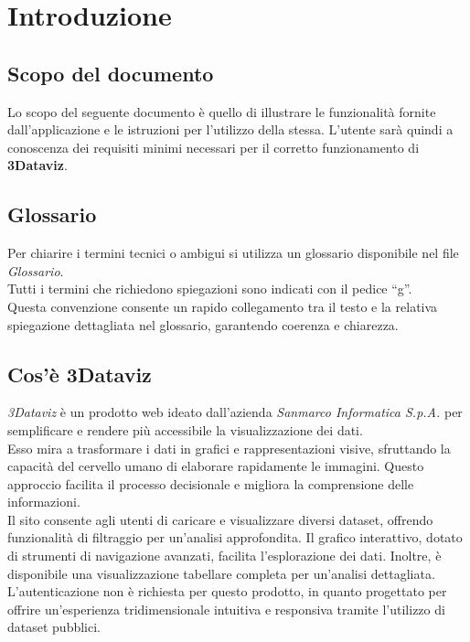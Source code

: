 \section{Introduzione}
\subsection{Scopo del documento}
Lo scopo del seguente documento è quello di illustrare le funzionalità fornite dall’applicazione e le istruzioni
per l’utilizzo della stessa. L’utente sarà quindi a conoscenza dei requisiti minimi necessari per il
corretto funzionamento di \textbf{3Dataviz}.

\subsection{Glossario}
Per chiarire i termini tecnici o ambigui si utilizza un glossario disponibile nel file \textit{Glossario}.\\
Tutti i termini che richiedono spiegazioni sono indicati con il pedice “g”. \\
Questa convenzione consente un rapido collegamento tra il testo e la relativa spiegazione dettagliata nel glossario, garantendo coerenza e chiarezza.

\subsection{Cos'è 3Dataviz}
\textit{3Dataviz} è un prodotto web ideato dall'azienda \textit{Sanmarco Informatica S.p.A.} per semplificare e rendere più accessibile la visualizzazione dei dati.\\
Esso mira a trasformare i dati in grafici e rappresentazioni visive, sfruttando la capacità del cervello umano di elaborare rapidamente le immagini. 
Questo approccio facilita il processo decisionale e migliora la comprensione delle informazioni.\\

Il sito consente agli utenti di caricare e visualizzare diversi dataset, offrendo funzionalità di filtraggio per un'analisi approfondita.
Il grafico interattivo, dotato di strumenti di navigazione avanzati, facilita l'esplorazione dei dati. 
Inoltre, è disponibile una visualizzazione tabellare completa per un'analisi dettagliata.\\

L'autenticazione non è richiesta per questo prodotto, in quanto progettato per offrire un'esperienza tridimensionale
intuitiva e responsiva tramite l'utilizzo di dataset pubblici.

